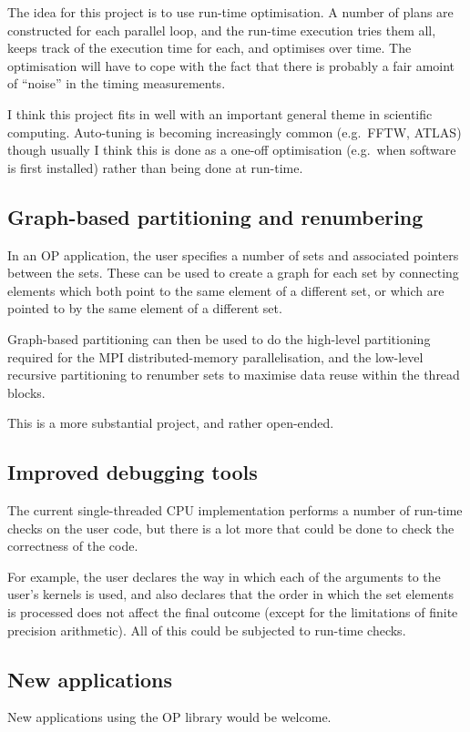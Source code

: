 \documentclass[12pt]{article}
\begin{document}
The idea for this project is to use run-time optimisation.  A number
of plans are constructed for each parallel loop, and the run-time execution
tries them all, keeps track of the execution time for each, and optimises
over time.  The optimisation will have to cope with the fact that there 
is probably a fair amoint of ``noise'' in the timing measurements.

I think this project fits in well with an important general theme in
scientific computing. Auto-tuning is becoming increasingly common 
(e.g.~FFTW, ATLAS) though usually I think this is done as a one-off 
optimisation (e.g.~when software is first installed) rather than
being done at run-time.


\subsection{Graph-based partitioning and renumbering}

In an OP application, the user specifies a number of sets and 
associated pointers between the sets.  These can be used to 
create a graph for each set by connecting elements which both
point to the same element of a different set, or which are pointed 
to by the same element of a different set.  

Graph-based partitioning
can then be used to do the high-level partitioning required for the
MPI distributed-memory parallelisation, and the low-level recursive
partitioning to renumber sets to maximise data reuse within the
thread blocks.

This is a more substantial project, and rather open-ended.


\subsection{Improved debugging tools}

The current single-threaded CPU implementation performs a number
of run-time checks on the user code, but there is a lot more that 
could be done to check the correctness of the code.

For example, the user declares the way in which each of the arguments
to the user's kernels is used, and also declares that the order in
which the set elements is processed does not affect the final outcome
(except for the limitations of finite precision arithmetic).  All of
this could be subjected to run-time checks.

\subsection{New applications}

New applications using the OP library would be welcome.
\end{document}
